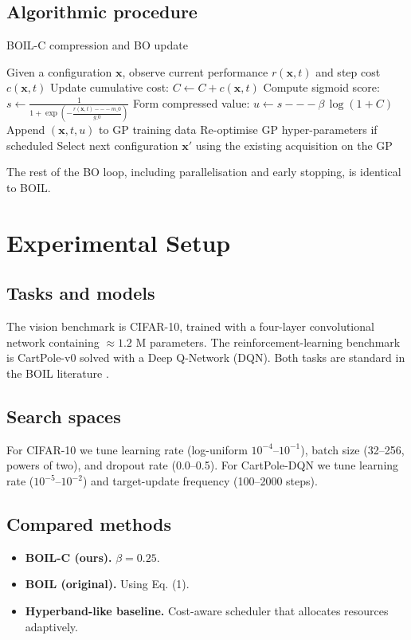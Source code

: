\documentclass{article} %
\begin{document}
\subsection{Algorithmic procedure}
\begin{algorithm}[H]
\caption{BOIL-C compression and BO update}
\begin{algorithmic}[1]
  \State{} Given a configuration \(\mathbf{x}\), observe current performance \(r(\mathbf{x}, t)\) and step cost \(c(\mathbf{x}, t)\)
  \State{} Update cumulative cost: \(C \leftarrow C + c(\mathbf{x}, t)\)
  \State{} Compute sigmoid score: \(s \leftarrow \frac{1}{1 + \exp\!\left(-\frac{r(\mathbf{x}, t) --- m\_0}{g\_0}\right)}\)
  \State{} Form compressed value: \(u \leftarrow s --- \beta\,\log(1 + C)\)
  \State{} Append \((\mathbf{x}, t, u)\) to GP training data
  \State{} Re-optimise GP hyper-parameters if scheduled
  \State{} Select next configuration \(\mathbf{x}'\) using the existing acquisition on the GP
\end{algorithmic}
\end{algorithm}

The rest of the BO loop, including parallelisation and early stopping, is identical to BOIL\@.

\section{Experimental Setup}\label{sec:experimental}

\subsection{Tasks and models}
The vision benchmark is CIFAR-10, trained with a four-layer convolutional network containing \(\approx 1.2\) M parameters. The reinforcement-learning benchmark is CartPole-v0 solved with a Deep Q-Network (DQN). Both tasks are standard in the BOIL literature \@.\cite{nguyen-2019-bayesian}

\subsection{Search spaces}
For CIFAR-10 we tune learning rate (log-uniform \(10^{-4}\)–\(10^{-1}\)), batch size (32–256, powers of two), and dropout rate (0.0–0.5). For CartPole-DQN we tune learning rate (\(10^{-5}\)–\(10^{-2}\)) and target-update frequency (100–2000 steps).

\subsection{Compared methods}
\begin{itemize}
  \item \textbf{BOIL-C (ours).} \(\beta = 0.25\).
  \item \textbf{BOIL (original).} Using Eq. (1).
  \item \textbf{Hyperband-like baseline.} Cost-aware scheduler that allocates resources adaptively.
\end{itemize}
\end{document}
